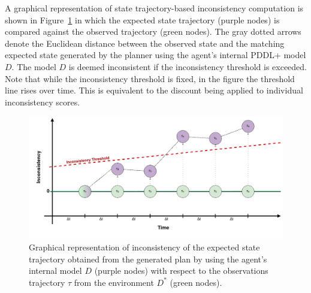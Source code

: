 \documentclass[letterpaper]{article} %
\newcommand{\roni}[1]{{\textcolor{green}{[Roni: #1]}}}
\begin{document}
A graphical representation of state trajectory-based inconsistency computation is shown in Figure~\ref{fig:inconsistency_trajectory} in which the expected state trajectory (purple nodes) is compared against the observed trajectory (green nodes). The gray dotted arrows denote the Euclidean distance between the observed state and the matching expected state generated by the planner using the agent's internal PDDL+ model $D$. The model $D$ is deemed inconsistent if the inconsistency threshold is exceeded. Note that while the inconsistency threshold is fixed, in the figure the threshold line rises over time. This is equivalent to the discount being applied to individual inconsistency scores.





\begin{figure}
	\centering
	\includegraphics[width=\columnwidth]{figures/trajectory_inconsistency2.png}
	\caption{Graphical representation of inconsistency of the expected state trajectory obtained from the generated plan by using the agent's internal model $D$ (purple nodes) with respect to the observations trajectory $\tau$ from the environment $D^*$ (green nodes).}
	\label{fig:inconsistency_trajectory}
\end{figure}
\end{document}
